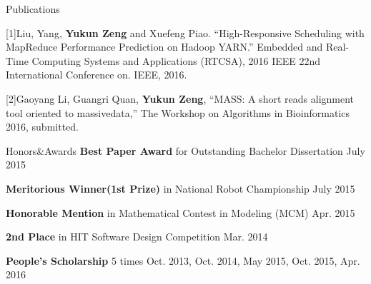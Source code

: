 \documentclass{resume} %
\begin{document}
\begin{rSection}{Publications}

{[1]Liu, Yang, }{\bf Yukun Zeng}{ and Xuefeng Piao. ``High-Responsive Scheduling with MapReduce Performance Prediction on Hadoop YARN.'' Embedded and Real-Time Computing Systems and Applications (RTCSA), 2016 IEEE 22nd International Conference on. IEEE, 2016.
}
\vspace*{-0.2em}

{[2]Gaoyang Li, Guangri Quan, }{\bf Yukun Zeng}{, ``MASS: A short reads alignment tool oriented to massive}{data,'' The Workshop on Algorithms in Bioinformatics 2016, submitted.}

\end{rSection}


\begin{rSection}{Honors\&Awards}
{\bf Best Paper Award}{ for Outstanding Bachelor Dissertation} \hfill {July 2015}
\vspace*{-0.4em}

{\bf Meritorious Winner(1st Prize)}{ in National Robot Championship} \hfill {July 2015}
\vspace*{-0.4em}

{\bf Honorable Mention}{ in Mathematical Contest in Modeling (MCM)} \hfill {Apr. 2015}
\vspace*{-0.4em}

{\bf 2nd Place}{ in HIT Software Design Competition} \hfill {Mar. 2014} 
\vspace*{-0.4em}

{\bf People's Scholarship} 5 times \hfill {Oct. 2013, Oct. 2014, May 2015, Oct. 2015, Apr. 2016}
\vspace*{-0.4em}

\end{rSection}
\end{document}
